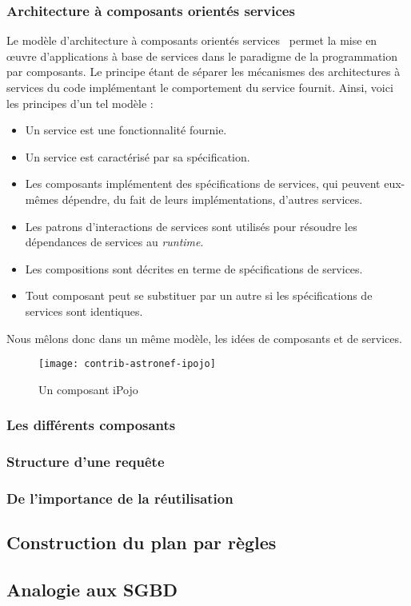 \subsubsection{Architecture à composants orientés services}
Le modèle d'architecture à composants orientés services~\cite{Cervantes:servicecomponent} permet la mise en œuvre d'applications à base de services dans le paradigme de la programmation par composants. Le principe étant de séparer les mécanismes des architectures à services du code implémentant le comportement du service fournit. Ainsi, voici les principes d'un tel modèle :
\begin{itemize}
    \item Un service est une fonctionnalité fournie.
    \item Un service est caractérisé par sa spécification.
    \item Les composants implémentent des spécifications de services, qui peuvent eux-mêmes dépendre, du fait de leurs implémentations, d'autres services.
    \item Les patrons d'interactions de services sont utilisés pour résoudre les dépendances de services au \textit{runtime}.
    \item Les compositions sont décrites en terme de spécifications de services.
    \item Tout composant peut se substituer par un autre si les spécifications de services sont identiques.
\end{itemize}
Nous mêlons donc dans un même modèle, les idées de composants et de services.

\begin{figure}[ht]
    \centering
    \texttt{[image: contrib-astronef-ipojo]}
    \caption{Un composant iPojo}\label{fig:contrib:astronef:ipojo}
\end{figure}

\subsubsection{Les différents composants}
\subsubsection{Structure d'une requête}
\subsubsection{De l'importance de la réutilisation}

\subsection{Construction du plan par règles}
\subsection{Analogie aux SGBD}